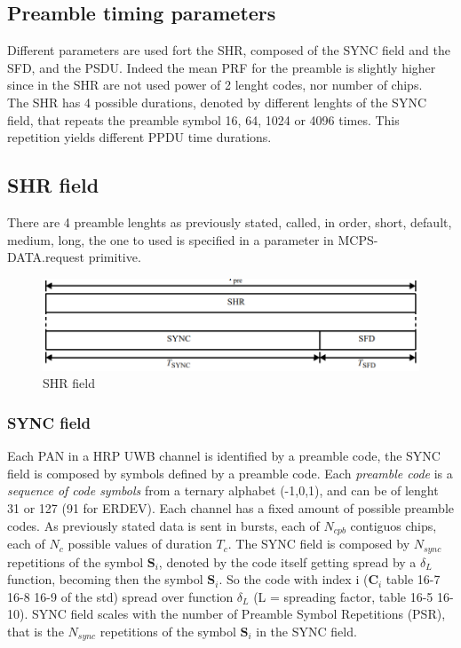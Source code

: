 \documentclass[conference]{IEEEtran}
\begin{document}
\subsection{Preamble timing parameters}
Different parameters are used fort the SHR, composed of the SYNC field and the SFD, and the
PSDU. Indeed the mean PRF for the preamble is slightly higher since in the SHR are not used
power of 2 lenght codes, nor number of chips.\\
The SHR has 4 possible durations, denoted by different lenghts of the SYNC field, that
repeats the preamble symbol 16, 64, 1024 or 4096 times. This repetition yields different PPDU
time durations.

\subsection{SHR field}
There are 4 preamble lenghts as previously stated, called, in order, short, default,
medium, long, the one to used is specified in a parameter in MCPS-DATA.request primitive.

\begin{figure}[!h]
  \centering
  \includegraphics[width=\linewidth]{SHR}
  \caption{SHR field}
  \label{fig:SHR}
\end{figure}

\subsubsection{SYNC field}
\label{SYNC}
Each PAN in a HRP UWB channel is identified by a preamble code, the SYNC field is composed 
by symbols defined by a preamble code. Each \emph{preamble code} is a \emph{sequence of code 
symbols} from a ternary alphabet (-1,0,1), and can be of lenght 31 or 127 (91 for ERDEV). 
Each channel has a fixed amount of possible preamble codes. As previously stated data is sent 
in bursts, each of $N_{cpb}$ contiguos chips, each of $N_{c}$ possible values of duration 
$T_{c}$. The SYNC field is composed by $N_{sync}$ repetitions of 
the symbol $\mathbf{S}_i$, denoted by the code itself getting spread by a $\delta_{L}$ function,
becoming then the symbol $\mathbf{S}_i$. So the code with index i ($\mathbf{C}_i$ table 16-7 
16-8 16-9 of the std) spread over function $\delta_{L}$ (L = spreading factor, table 16-5 
16-10). SYNC field scales with the number of Preamble Symbol Repetitions (PSR), that is the
$N_{sync}$ repetitions of the symbol $\mathbf{S}_i$ in the SYNC field.
\end{document}
